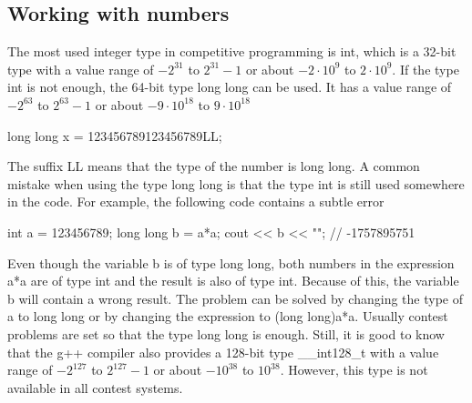 \documentclass{report}
\begin{document}
    \bigbreak \noindent 
    \subsection{Working with numbers}
    \bigbreak \noindent 
    The most used integer type in competitive programming is int, which is a 32-bit type with a value range of $-2^{31}$ to $2^{31}-1$ or about $-2 \cdot 10^{9} $ to $2 \cdot 10^{9} $. If the type int is not enough, the 64-bit type long long can be used. It has a value range of $-2^{63}$ to $2^{63}-1$ or about $-9\cdot 10^{18}$ to $9 \cdot 10^{18} $
    \bigbreak \noindent 
    \begin{cppcode}
    long long x = 123456789123456789LL;
    \end{cppcode}
    \bigbreak \noindent 
    The suffix LL means that the type of the number is long long.
    \bigbreak \noindent 
    A common mistake when using the type long long is that the type int is still
    used somewhere in the code. For example, the following code contains a subtle
    error
    \bigbreak \noindent 
    \begin{cppcode}
        int a = 123456789;
        long long b = a*a;
        cout << b << "\n"; // -1757895751
    \end{cppcode}
    \bigbreak \noindent 
    Even though the variable b is of type long long, both numbers in the expression a*a are of type int and the result is also of type int. Because of this, the variable b will contain a wrong result. The problem can be solved by changing the type of a to long long or by changing the expression to (long long)a*a.
    \bigbreak \noindent 
    Usually contest problems are set so that the type long long is enough. Still, it is good to know that the g++ compiler also provides a 128-bit type \_\_int128\_t with a value range of $-2^{127}$ to $2^{127}-1$ or about $-10^{38}$ to $10^{38}$. However, this type is not available in all contest systems.

    \bigbreak \noindent 
\end{document}
